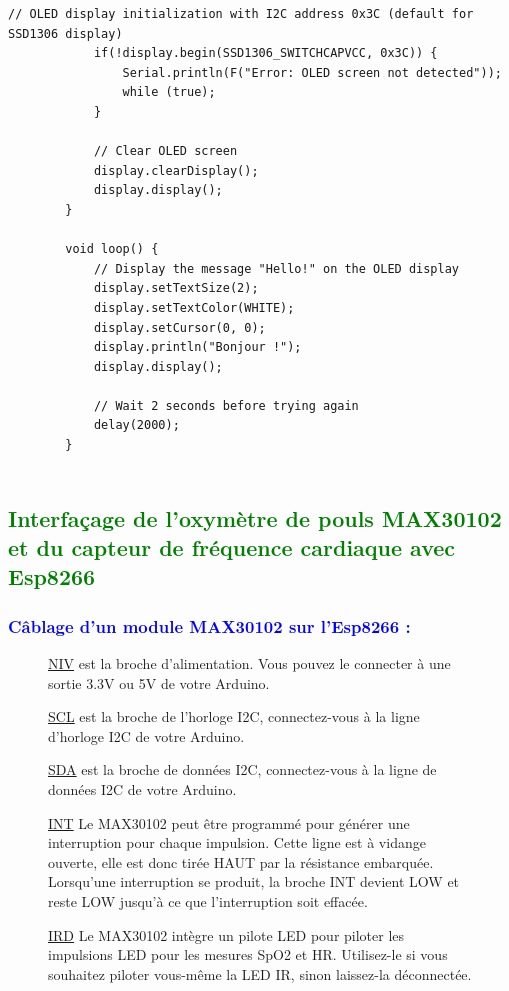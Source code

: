 \begin{flushleft}
\begin{lstlisting}[style=CStyle]
			// OLED display initialization with I2C address 0x3C (default for SSD1306 display)
			if(!display.begin(SSD1306_SWITCHCAPVCC, 0x3C)) {
				Serial.println(F("Error: OLED screen not detected"));
				while (true);
			}
			
			// Clear OLED screen
			display.clearDisplay();
			display.display();
		}
		
		void loop() {
			// Display the message "Hello!" on the OLED display
			display.setTextSize(2);
			display.setTextColor(WHITE);
			display.setCursor(0, 0);
			display.println("Bonjour !");
			display.display();
			
			// Wait 2 seconds before trying again
			delay(2000);
		}
		
	\end{lstlisting}
	
	
	
	\subsection{\textcolor{green}{Interfaçage de l’oxymètre de pouls MAX30102 et du capteur de fréquence cardiaque avec Esp8266}}
	
	
	\subsubsection{\textcolor{blue}{Câblage d’un module MAX30102 sur l'Esp8266 :}}
	\begin{figure}[h]
		\begin{minipage}{0.6\textwidth}
			\underline{NIV} est la broche d’alimentation. Vous pouvez le connecter à une sortie 3.3V ou 5V de votre Arduino.
			
			\underline{SCL} est la broche de l’horloge I2C, connectez-vous à la ligne d’horloge I2C de votre Arduino.
			
			\underline{SDA} est la broche de données I2C, connectez-vous à la ligne de données I2C de votre Arduino.
			
			\underline{INT} Le MAX30102 peut être programmé pour générer une interruption pour chaque impulsion. Cette ligne est à vidange ouverte, elle est donc tirée HAUT par la résistance embarquée. Lorsqu’une interruption se produit, la broche INT devient LOW et reste LOW jusqu’à ce que l’interruption soit effacée.
			
			\underline{IRD} Le MAX30102 intègre un pilote LED pour piloter les impulsions LED pour les mesures SpO2 et HR. Utilisez-le si vous souhaitez piloter vous-même la LED IR, sinon laissez-la déconnectée.
			

\end{minipage}
\end{figure}
\end{flushleft}
